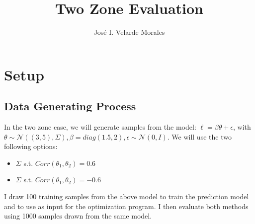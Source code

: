 \documentclass[11pt]{article}
\title{Two Zone Evaluation}
\author{José I. Velarde Morales}
\begin{document}
\maketitle

\section{Setup}
    \subsection*{Data Generating Process}
    In the two zone case, we will generate samples from the model: $\ell = \beta \theta + \epsilon$, with $\theta \sim \mathcal{N}((3,5),\Sigma), \beta = diag(1.5,2), \epsilon \sim \mathcal{N}(0,I)$. We will use the two following options:
    \begin{itemize}
        \item $\Sigma$ s.t. $Corr(\theta_1,\theta_2)=0.6$
        \item $\Sigma$ s.t. $Corr(\theta_1,\theta_2)=-0.6$
    \end{itemize}
    I draw 100 training samples from the above model to train the prediction model and to use as input for the optimization program. I then evaluate both methods using 1000 samples drawn from the same model. 
\end{document}
